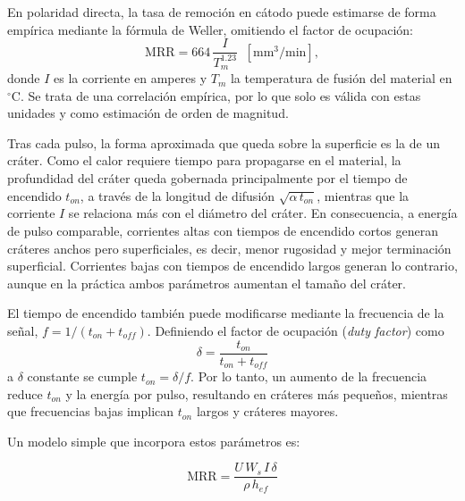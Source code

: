 En polaridad directa, la tasa de remoción en cátodo puede estimarse de forma empírica mediante la fórmula de Weller, omitiendo el factor de ocupación:
\begin{equation}
	\mathrm{MRR} = 664\,\frac{I}{T_{m}^{1.23}} \;\; \mathrm{[mm^{3}/min]},
\end{equation}
donde $I$ es la corriente en amperes y $T_m$ la temperatura de fusión del material en $^\circ$C. Se trata de una correlación empírica, por lo que solo es válida con estas unidades y como estimación de orden de magnitud.

Tras cada pulso, la forma aproximada que queda sobre la superficie es la de un cráter. Como el calor requiere tiempo para propagarse en el material, la profundidad del cráter queda gobernada principalmente por el tiempo de encendido $t_{on}$, a través de la longitud de difusión $\sqrt{\alpha\,t_{on}}$, mientras que la corriente $I$ se relaciona más con el diámetro del cráter. En consecuencia, a energía de pulso comparable, corrientes altas con tiempos de encendido cortos generan cráteres anchos pero superficiales, es decir, menor rugosidad y mejor terminación superficial. Corrientes bajas con tiempos de encendido largos generan lo contrario, aunque en la práctica ambos parámetros aumentan el tamaño del cráter.

El tiempo de encendido también puede modificarse mediante la frecuencia de la señal, $f = 1/(t_{on}+t_{off})$. Definiendo el factor de ocupación (\textit{duty factor}) como
\begin{equation}
	\delta = \frac{t_{on}}{t_{on}+t_{off}}
\end{equation}
a $\delta$ constante se cumple $t_{on} = \delta/f$. Por lo tanto, un aumento de la frecuencia reduce $t_{on}$ y la energía por pulso, resultando en cráteres más pequeños, mientras que frecuencias bajas implican $t_{on}$ largos y cráteres mayores.

Un modelo simple que incorpora estos parámetros es\cite{Sharakhovsky2006}:

\begin{equation}
	\mathrm{MRR} = \frac{U\,W_{s}\,I\,\delta}{\rho\, h_{ef}}
\end{equation}

